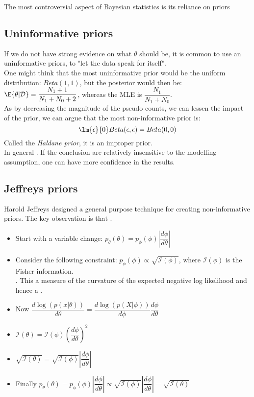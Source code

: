 The most controversial aspect of Bayesian statistics is its reliance on priors
\subsection{Uninformative priors}
If we do not have strong evidence on what $\theta$ should be, it is common to use an
uninformative priors, to "let the data speak for itself".\\
One might think that the most uninformative prior would be the uniform distribution: 
$Beta(1, 1)$, but the posterior would then be: $\E{\theta|\mathcal{D}} =
\dfrac{N_{1}+1}{N_{1}+N_{0}+2}$, whereas the MLE is $\dfrac{N_{1}}{N_{1}+N_{0}}$.\\
As by decreasing the magnitude of the pseudo counts, we can lessen the impact of the 
prior, we can argue that the most non-informative prior is: 
$$\lm{\epsilon}{0} Beta(\epsilon, \epsilon) = Beta(0, 0)$$
Called the \emph{Haldane prior}, it is an improper prior.\\
In general .
If the conclusion are relatively insensitive to the modelling assumption, one can have
more confidence in the results.
\subsection{Jeffreys priors}
Harold Jeffreys designed a general purpose technique for creating non-informative priors.
The key observation is that .
\begin{itemize}
	\item Start with a variable change: $p_{\theta}(\theta) = p_{\phi}(\phi)\left|\dfrac{d\phi}{d\theta}\right|$
	\item Consider the following constraint: $p_{\phi}(\phi)\propto
		\sqrt{\mathcal{I}(\phi)}$, where $\mathcal{I}(\phi)$ is the Fisher 
        information.\\ . This a measure of the
        curvature of the expected negative log likelihood and hence a .
	\item Now $\dfrac{d\log(p(x|\theta))}{d\theta} = 
		\dfrac{d\log(p(X|\phi))}{d\phi}\dfrac{d\phi}{d\theta}$
	\item $\mathcal{I}(\theta) = \mathcal{I}(\phi)
		\left(\dfrac{d\phi}{d\theta}\right)^{2}$
	\item $\sqrt{\mathcal{I}(\theta)} = \sqrt{\mathcal{I}(\phi)}\left|\dfrac{d\phi}
		{d\theta}\right|$
	\item Finally $p_{\theta}(\theta) = p_{\phi}(\phi)\left|\dfrac{d\phi}
		{d\theta}\right| \propto \sqrt{\mathcal{I}(\phi)}\left|\dfrac{d\phi}
		{d\theta}\right| = \sqrt{\mathcal{I}(\theta)}$
\end{itemize}

